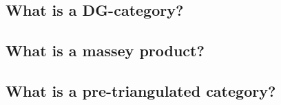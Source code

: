 \subsection{What is a DG-category?}


\subsection{What is a massey product?}


\subsection{What is a pre-triangulated category?}
